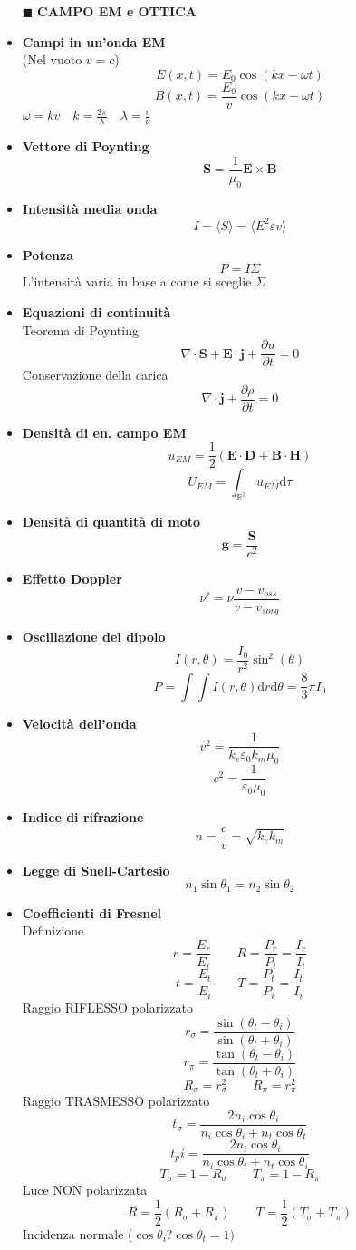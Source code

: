 \documentclass{book}
\newcommand{\g}{\textbf}
\newcommand{\h}{\mathbf}
\newcommand{\e}{\begin{equation}}
\newcommand{\ex}{\end{equation} }
\renewcommand{\it}{\item[$\cdot$]}
\begin{document}
\begin{multicols*}{4}
\begin{itemize}
\item [$\blacksquare$] \g{CAMPO EM e OTTICA}
    \it \g{Campi in un'onda EM} \\
    (Nel vuoto $v=c$)
    \e{E(x,t)=E_0\cos(kx-\omega t)} \ex
    \e{B(x,t)=\frac{E_0}{v}\cos(kx-\omega t)} \ex
    $\omega=kv \quad k=\frac{2\pi}{\lambda} \quad \lambda=\frac{v}{\nu}$ \\
    \it \g{Vettore di Poynting}
    \e{\h{S}=\frac{1}{\mu_0}\h{E}\times\h{B}} \ex
    \it \g{Intensità media onda}
    \e{I=\langle S\rangle=\langle E^2\varepsilon v\rangle} \ex
    \it \g{Potenza}
    \e{P=I\Sigma} \ex
    L'intensità varia in base a come si sceglie $\Sigma$ \\
    \it \g{Equazioni di continuità} \\
    Teorema di Poynting
    \e{\nabla\cdot \h{S}+\h{E}\cdot\h{j}+\frac{\partial u}{\partial t}=0 } \ex
    Conservazione della carica
    \e{\nabla\cdot\h{j}+\frac{\partial \rho}{\partial t}=0} \ex
    \it \g{Densità di en. campo EM}
    \e{u_{EM}=\frac{1}{2}(\h{E}\cdot\h{D}+\h{B}\cdot\h{H})} \ex
    \e{U_{EM}=\int_{\mathbb{R}^3}u_{EM} \mathrm{d}\tau} \ex
    \it \g{Densità di quantità di moto}
    \e{\h{g}=\frac{\h{S}}{c^2}} \ex
    \it \g{Effetto Doppler}
    \e{\nu'=\nu\frac{v-v_{oss}}{v-v_{sorg}}} \ex
    \it \g{Oscillazione del dipolo}
    \e{I(r,\theta)=\frac{I_0}{r^2}\sin^2(\theta)} \ex
    \e{P=\int \int I(r,\theta) \mathrm{d}r \mathrm{d}\theta=\frac{8}{3}\pi I_0}\ex
    \it \g{Velocità dell'onda}
    \e{v^2=\frac{1}{k_e \varepsilon_0 k_m \mu_0}} \ex
    \e{c^2=\frac{1}{\varepsilon_0 \mu_0}} \ex
    \it \g{Indice di rifrazione}
    \e{n=\frac{c}{v}=\sqrt{k_ek_m}} \ex
    \it \g{Legge di Snell-Cartesio}
    \e{n_1 \sin\theta_1=n_2 \sin\theta_2} \ex
    \it \g{Coefficienti di Fresnel} \\
    Definizione
    \e{r=\frac{E_r}{E_i} \qquad R=\frac{P_r}{P_i}=\frac{I_r}{I_i}} \ex
    \e{t=\frac{E_t}{E_i} \qquad T=\frac{P_t}{P_i}=\frac{I_t}{I_i}} \ex
    Raggio RIFLESSO polarizzato
    \e{r_\sigma=\frac{\sin(\theta_t-\theta_i)}{\sin(\theta_t+\theta_i)}} \ex
    \e{r_\pi=\frac{\tan(\theta_t-\theta_i)}{\tan(\theta_t+\theta_i)}} \ex
    \e{R_\sigma=r_\sigma^2 \qquad R_\pi=r_\pi^2} \ex
    Raggio TRASMESSO polarizzato
    \e{t_\sigma=\frac{2n_i\cos\theta_i}{n_i\cos\theta_i+n_t\cos\theta_t}} \ex
    \e{t_pi=\frac{2n_i\cos\theta_i}{n_i\cos\theta_t+n_t\cos\theta_i}} \ex
    \e{T_\sigma=1-R_\sigma \qquad T_\pi=1-R_\pi} \ex
    Luce NON polarizzata
    \e{R=\frac{1}{2}(R_\sigma+R_\pi) \qquad T=\frac{1}{2}(T_\sigma+T_\pi)} \ex
    Incidenza normale ($\cos\theta_i?\cos\theta_t=1)$

\end{itemize}
\end{multicols*}
\end{document}
